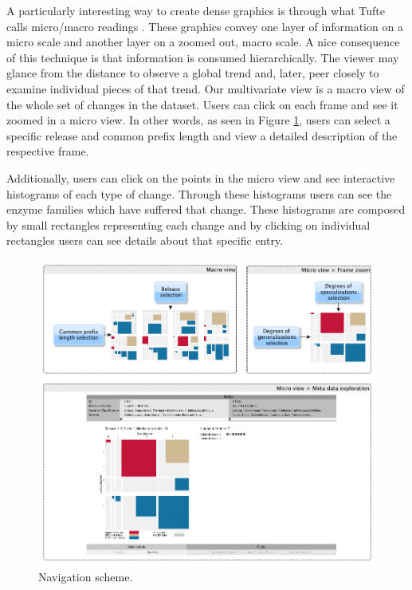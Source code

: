 A particularly interesting way to create dense graphics is through what Tufte calls micro/macro readings \cite{tufte_envisioning}. These graphics convey one layer of information on a micro scale and another layer on a zoomed out, macro scale. A nice consequence of this technique is that information is consumed hierarchically. The viewer may glance from the distance to observe a global trend and, later, peer closely to examine individual pieces of that trend. Our multivariate view is a macro view of the whole set of changes in the dataset. Users can click on each frame and see it zoomed in a micro view. In other words, as seen in Figure \ref{fig:navigation}, users can select a specific release and common prefix length and view a detailed description of the respective frame.

Additionally, users can click on the points in the micro view and see interactive histograms of each type of change. Through these histograms users can see the enzyme families which have suffered that change. These histograms are composed by small rectangles representing each change and by clicking on individual rectangles users can see details about that specific entry. 

\begin{figure}[htb]
  \centering
  \includegraphics[width=17cm]{images/navigation2.png} 
  \caption{Navigation scheme.}
  \label{fig:navigation}
\end{figure}
